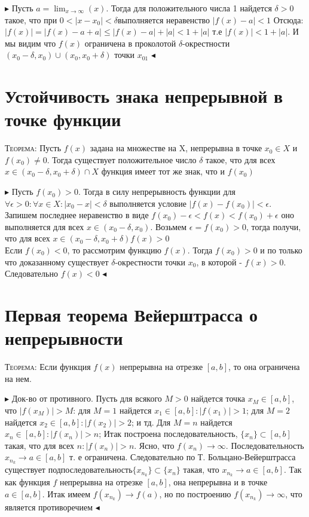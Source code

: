 \documentclass[14pt]{article}
\begin{document}
        $\blacktriangleright$
            Пусть $a=\lim_{x\rightarrow \infty}(x)$. Тогда для положительного числа 1 найдется $\delta > 0 $ такое, что при $0 < |x-x_0| < \delta$выполняется неравенство  $|f(x) - a| < 1$ Отсюда: $|f(x)| = |f(x) - a + a| \leqslant |f(x) -a| + |a|  < 1 + |a| $ т.е $|f(x)| < 1 + |a|$. И мы видим что $f(x)$ ограничена в проколотой $\delta$-окрестности $(x_0-\delta,x_0) \cup (x_0, x_0+\delta) $ точки $x_01$ 
        $\blacktriangleleft$\\

    \section{Устойчивость знака непрерывной в точке функции}
        \textsc{Теорема:} Пусть $f(x)$ задана на множестве на X, непрерывна в точке $x_0 \in X$ и $f(x_0) \ne 0$. Тогда существует положительное число $\delta$ такое, что для всех $x \in (x_0 - \delta, x_0 + \delta) \cap X$ функция имеет тот же знак, что и $f(x_0)$

        $\blacktriangleright$ 
            Пусть $f(x_0) > 0$. Тогда в силу непрерывность функции для $\forall \epsilon > 0: \forall x \in X: |x_0 - x | < \delta$ выполняется условие $|f(x)-f(x_0)| < \epsilon$. Запишем последнее неравенство в виде $f(x_0) - \epsilon < f(x) < f(x_0) + \epsilon$ оно выполняется для всех $x \in (x_0 - \delta, x_0 )$. Возьмем $\epsilon = f(x_0) > 0$, тогда получи, что для всех $x \in (x_0-\delta, x_0+\delta) f(x) > 0$ \\ 
            Если $f(x_0) < 0$, то рассмотрим функцию $f(x)$. Тогда $f(x_0)>0$ и по только что доказанному существует $\delta$-окрестности точки $x_0$, в которой - $f(x)>0$. Следовательно $f(x)<0$
        $\blacktriangleleft$\\

    \section{Первая теорема Вейерштрасса о непрерывности}
        \textsc{Теорема:} Если функция $f(x)$ непрерывна на отрезке $[a,b]$, то она ограничена на нем. 

        $\blacktriangleright$ Док-во от противного. 
            Пусть для всякого $M>0$ найдется точка $x_M \in [a,b]$, что $|f(x_M)| > M$: для $M=1$ найдется $x_1 \in [a,b]:|f(x_1)|>1$; для $M=2$ найдется $x_2 \in [a,b]:|f(x_2)|>2$; и тд. Для $M=n$ найдется $x_n \in [a,b]:|f(x_n)|>n$; Итак построена последовательность, $\{x_n\} \subset [a,b]$ такая, что для всех $n: |f(x_n)| > n$. Ясно, что $f(x_n) \rightarrow \infty$. Последовательность $x_{n_k} \rightarrow a \in [a,b]$ т. е ограничена. Следовательно по Т. Больцано-Вейерштрасса существует подпоследовательность$\{x_{n_k}\} \subset \{x_n\}$ такая, что $x_{n_k} \rightarrow a \in [a,b]$. Так как функция $f$ непрерывна на отрезке $[a,b]$, она непрерывна и в точке $a \in [a,b]$. Итак имеем $f(x_{n_k}) \rightarrow f(a)$, но по построению $f(x_{n_k}) \rightarrow   \infty$, что является противоречием
        $\blacktriangleleft$\\
\end{document}
